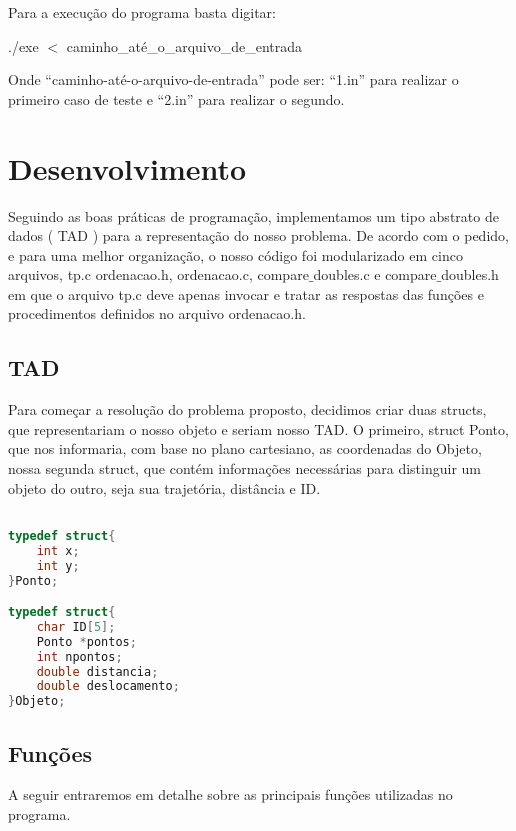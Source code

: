 \documentclass{article}
\begin{document}
Para a execução do programa basta digitar:
\begin{tcolorbox}[title=,width=\linewidth]
    ./exe $<$ caminho\_até\_o\_arquivo\_de\_entrada
\end{tcolorbox}

Onde “caminho-até-o-arquivo-de-entrada” pode ser: “1.in” para realizar o primeiro caso de teste e “2.in” para realizar o segundo.

\clearpage



\section{Desenvolvimento}

Seguindo as boas práticas de programação, implementamos um tipo abstrato de dados 
( TAD ) para a representação do nosso problema. De acordo com o pedido, e para uma 
melhor organização, o nosso código foi modularizado em cinco arquivos, tp.c ordenacao.h,
ordenacao.c, compare$\_$doubles.c e compare$\_$doubles.h em que o arquivo tp.c deve apenas invocar e tratar as respostas das funções e 
procedimentos definidos no arquivo ordenacao.h.

\subsection{TAD}
Para começar a resolução do problema proposto, decidimos criar duas structs, 
que representariam o nosso objeto e seriam nosso TAD. O primeiro, struct Ponto, 
que nos informaria, com base no plano cartesiano, as coordenadas do Objeto,
nossa segunda struct, que contém informações necessárias para distinguir um 
objeto do outro, seja sua trajetória, distância e ID.

\begin{lstlisting}[caption={TAD's representando Ponto e Objeto, respectivamente},label={lst:cod1},language=C]

typedef struct{
    int x;
    int y;
}Ponto;

typedef struct{
    char ID[5];
    Ponto *pontos;
    int npontos;
    double distancia;
    double deslocamento;
}Objeto;

\end{lstlisting}

\subsection{Funções}

A seguir entraremos em detalhe sobre as principais funções utilizadas no programa.
\end{document}
